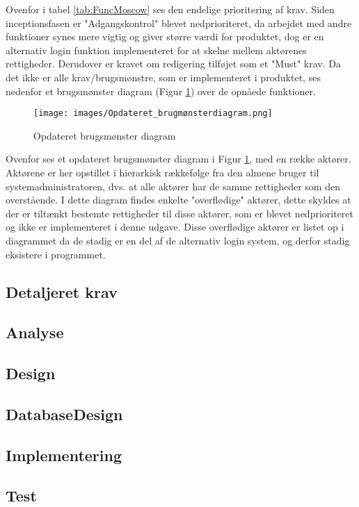 Ovenfor i tabel \ref{tab:FuncMoscow} ses den endelige prioritering af krav. Siden inceptionsfasen er "Adgangskontrol" blevet nedprioriteret, da arbejdet med andre funktioner synes mere vigtig og giver større værdi for produktet, dog er en alternativ login funktion implementeret for at skelne mellem aktørenes rettigheder. Derudover er kravet om redigering tilføjet som et "Must" krav.
Da det ikke er alle krav/brugsmønstre, som er implementeret i produktet, ses nedenfor et brugsmønster diagram (Figur \ref{fig:brugsmønster}) over de opnåede funktioner. 

\begin{figure}[H]
    \centering
\texttt{[image: images/Opdateret\_brugmønsterdiagram.png]}
    \caption{Opdateret brugsmønster diagram}
    \label{fig:brugsmønster}
\end{figure}

Ovenfor ses et opdateret brugsmønster diagram i Figur \ref{fig:brugsmønster}, med en række aktører. Aktørene er her opstillet i hierarkisk rækkefølge fra den almene bruger til systemadministratoren, dvs. at alle aktører har de samme rettigheder som den overstående. I dette diagram findes enkelte "overflødige" aktører, dette skyldes at der er tiltænkt bestemte rettigheder til disse aktører, som er blevet nedprioriteret og ikke er implementeret i denne udgave. Disse overflødige aktører er listet op i diagrammet da de stadig er en del af de alternativ login system, og derfor stadig eksistere i programmet.




\subsection{Detaljeret krav}

\subsection{Analyse}

\subsection{Design}

\subsection{DatabaseDesign}

\subsection{Implementering}

\subsection{Test}
